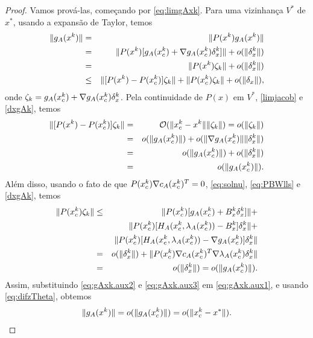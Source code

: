 \begin{proof}
Vamos prová-las, começando por \eqref{eq:limgAxk}. Para uma vizinhança $V^*$ de $x^*$, usando a 
expansão de Taylor, temos
\begin{eqnarray}
 \norma{g_A(x^k)} & = & \norma{P(x^k)g_A(x^k)} \nonumber \\
                  & = & \norma{P(x^k)[g_A(\xc{k}) + \nabla g_A(\xc{k})\delta_x^k]} + o(\norma{\delta_x^k}) 
\nonumber \\
& = & \norma{P(x^k)\zeta_k} + o(\norma{\delta_x^k}) \nonumber \\
& \leq & \norma{[P(x^k) - P(\xc{k})]\zeta_k} + \norma{P(\xc{k})\zeta_k} +
o(\norma{\delta_x}),
\visiblelbl{eq:gAxk.aux1}
\end{eqnarray}
onde $\zeta_k = g_A(x_c^{k}) + \nabla g_A(x_c^{k})\delta_x^k$.
Pela continuidade de $P(x)$ em $V^*$, \eqref{limjacob} e \eqref{dxgAk}, temos
\begin{eqnarray}
 \norma{[P(x^k) - P(\xc{k})]\zeta_k} & = & \bigo(\norma{\xc{k} - x^k}\norma{\zeta_k}) = 
o(\norma{\zeta_k}) \nonumber \\
 & = & o(\norma{g_A(\xc{k})}) + o(\norma{\nabla g_A(\xc{k})}\norma{\delta_x^k}) \nonumber \\
 & = & o(\norma{g_A(\xc{k})}) + o(\norma{\delta_x^k}) \nonumber \\
 & = & o(\norma{g_A(\xc{k})}).\visiblelbl{eq:gAxk.aux2}
\end{eqnarray}
Além disso, usando o fato de que $P(x_c^{k})\nabla c_A(x_c^{k})^T = 0$, \eqref{eq:solnu}, 
\eqref{eq:PBWlls} e \eqref{dxgAk}, temos
\begin{eqnarray}
 \norma{P(\xc{k})\zeta_k} & \leq & \norma{P(\xc{k})[g_A(\xc{k}) + B_x^k\delta_x^k]} + \nonumber 
\\
& & \norma{P(\xc{k})[H_A(\xc{k},\lambda_A(\xc{k})) - B_x^k]\delta_x^k} + \nonumber \\
& & \norma{P(\xc{k})[H_A(\xc{k},\lambda_A(\xc{k})) - \nabla g_A(\xc{k})]\delta_x^k} \nonumber 
\\
& = & o(\norma{\delta_x^k}) + \norma{P(\xc{k})\nabla c_A(\xc{k})^T\nabla 
\lambda_A(\xc{k})\delta_x^k} \nonumber \\
& = & o(\norma{\delta_x^k}) = o(\norma{g_A(\xc{k})}). \visiblelbl{eq:gAxk.aux3}
\end{eqnarray}
Assim, substituindo \eqref{eq:gAxk.aux2} e \eqref{eq:gAxk.aux3} em \eqref{eq:gAxk.aux1}, e 
usando \eqref{eq:difzTheta}, obtemos
\begin{eqnarray*}
 \Vert g_A(x^k)\Vert = o(\Vert g_A(x_c^{k})\Vert) = o(\Vert x_c^{k} - x^*\Vert).
\end{eqnarray*}

\end{proof}
